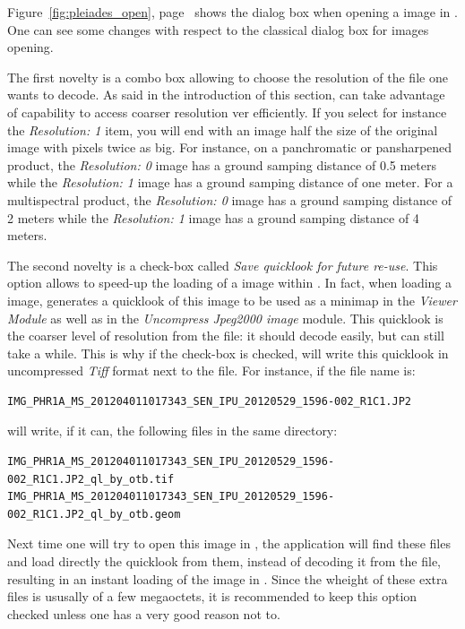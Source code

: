 Figure~\ref{fig:pleiades_open}, page~\pageref{fig:pleiades_open} shows
the dialog box when opening a \phr image in \mont. One can see some
changes with respect to the classical dialog box for images opening.

The first novelty is a combo box allowing to choose the resolution of
the \jpg file one wants to decode. As said in the introduction of
this section, \otb can take advantage of \jpg capability to access
coarser resolution ver efficiently. If you select for instance
the \textit{Resolution: 1} item, you will end with an image half the
size of the original image with pixels twice as big. For instance, on
a \phr panchromatic or pansharpened product,
the \textit{Resolution: 0} image has a ground samping distance of
0.5 meters while the \textit{Resolution: 1} image has a ground
samping distance of one meter. For a multispectral product,
the \textit{Resolution: 0} image has a ground samping distance of 2
meters while the \textit{Resolution: 1} image has a ground samping
distance of 4 meters.

The second novelty is a check-box called \textit{Save quicklook for
future re-use}. This option allows to speed-up the loading of a
\phr image within \mont. In fact, when loading a \phr
image, \mont generates a quicklook of this image to be used as a
minimap in the \textit{Viewer Module} as well as in
the \textit{Uncompress Jpeg2000 image} module. This quicklook is the
coarser level of resolution from the \jpg file: it should decode
easily, but can still take a while. This is why if the check-box is
checked, \mont will write this quicklook in uncompressed \textit{Tiff}
format next to the \jpg file. For instance, if the file name  is:
\begin{verbatim}
IMG_PHR1A_MS_201204011017343_SEN_IPU_20120529_1596-002_R1C1.JP2
\end{verbatim}

\mont will write, if it can, the following files in the same
directory:
\begin{verbatim}
IMG_PHR1A_MS_201204011017343_SEN_IPU_20120529_1596-002_R1C1.JP2_ql_by_otb.tif
IMG_PHR1A_MS_201204011017343_SEN_IPU_20120529_1596-002_R1C1.JP2_ql_by_otb.geom
\end{verbatim}

Next time one will try to open this image in \mont, the application
will find these files and load directly the quicklook from them,
instead of decoding it from the \jpg file, resulting in an instant
loading of the image in \mont. Since the wheight of these extra files
is ususally of a few megaoctets, it is recommended to keep this option
checked unless one has a very good reason not to.


